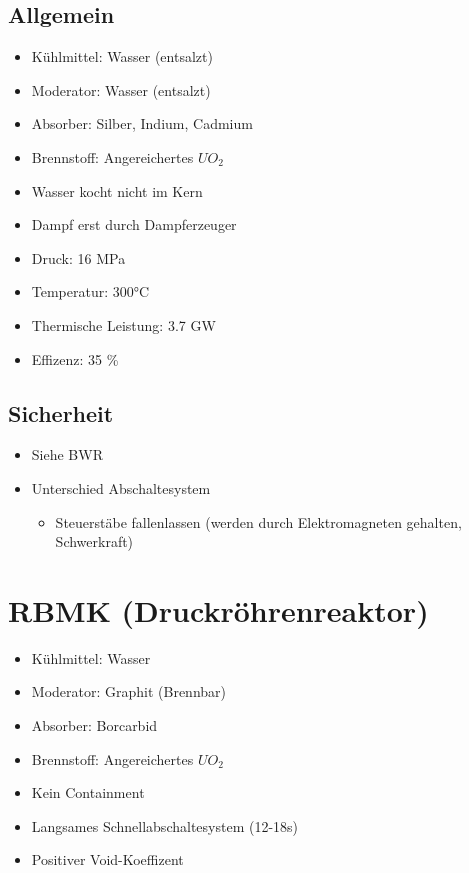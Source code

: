 \documentclass[12pt]{article}
\begin{document}
\subsection{Allgemein}
\begin{itemize}
  \item Kühlmittel: Wasser (entsalzt)
  \item Moderator: Wasser (entsalzt)
  \item Absorber: Silber, Indium, Cadmium
  \item Brennstoff: Angereichertes \(UO_2\)
  \item Wasser kocht nicht im Kern
  \item Dampf erst durch Dampferzeuger
  \item Druck: 16 MPa
  \item Temperatur: 300°C
  \item Thermische Leistung: 3.7 GW
  \item Effizenz: 35 \%
\end{itemize}

\subsection{Sicherheit}
\begin{itemize}
  \item Siehe BWR
  \item Unterschied Abschaltesystem
  \begin{itemize}
    \item Steuerstäbe fallenlassen (werden durch Elektromagneten gehalten, Schwerkraft)
  \end{itemize}
\end{itemize}

\section{RBMK (Druckröhrenreaktor)}
\begin{itemize}
  \item Kühlmittel: Wasser
  \item Moderator: Graphit (Brennbar)
  \item Absorber: Borcarbid
  \item Brennstoff: Angereichertes \(UO_2\)
  \item Kein Containment
  \item Langsames Schnellabschaltesystem (12-18s)
  \item Positiver Void-Koeffizent
\end{itemize}
\end{document}
